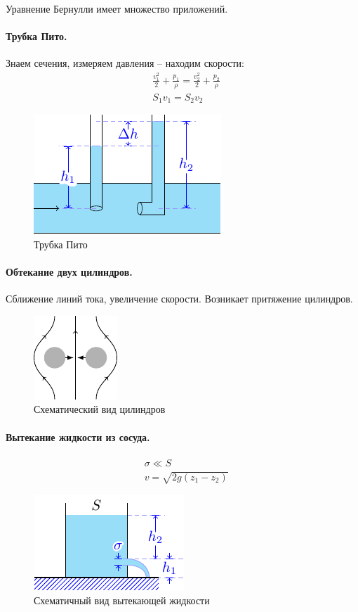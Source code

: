 Уравнение Бернулли имеет множество приложений.
\paragraph{Трубка Пито.}
Знаем сечения, измеряем давления -- находим скорости:
\begin{align*}
& \frac { v _ { 1 } ^ { 2 } } { 2 } + \frac { p _ { 1 } } { \rho } = \frac { v _ { 2 } ^ { 2 } } { 2 } + \frac { p _ { 2 } } { \rho } \\
& S _ { 1 } v _ { 1 } = S _ { 2 } v _ { 2 }
\end{align*}
\begin{figure}[H]
	\centering
	\includegraphics[scale=1.5]{img/pito}
	\caption{Трубка Пито}
	\label{fig:figure8}
\end{figure}


\paragraph{Обтекание двух цилиндров.}
Сближение линий тока, увеличение скорости. Возникает притяжение цилиндров.
\begin{figure}[H]
	\centering
	\includegraphics[scale=1.5]{img/2cy}
	\caption{Схематический вид цилиндров}
	\label{fig:figure9}
\end{figure}

\paragraph{Вытекание жидкости из сосуда.}
\begin{align*}
& \sigma \ll S \\
& v = \sqrt { 2 g \left( z _ { 1 } - z _ { 2 } \right) }
\end{align*}
\begin{figure}[H]
	\centering
	\includegraphics[scale=1.5]{img/vutekanie}
	\caption{Схематичный вид вытекающей жидкости}
	\label{fig:figure10}
\end{figure}

